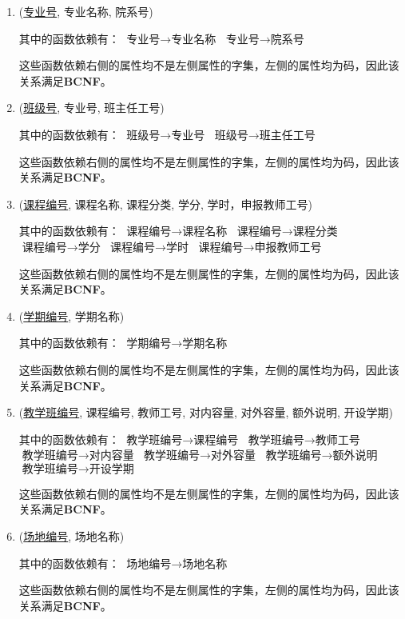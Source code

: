 \begin{enumerate}
    \item (\uline{专业号}, 专业名称, 院系号) \par
    其中的函数依赖有：
    $\text{专业号} \rightarrow \text{专业名称}$
    $\text{专业号} \rightarrow \text{院系号}$ \par
    这些函数依赖右侧的属性均不是左侧属性的字集，左侧的属性均为码，因此该关系满足\textbf{BCNF}。
    
    \item (\uline{班级号}, 专业号, 班主任工号) \par
    其中的函数依赖有：
    $\text{班级号} \rightarrow \text{专业号}$
    $\text{班级号} \rightarrow \text{班主任工号}$ \par
    这些函数依赖右侧的属性均不是左侧属性的字集，左侧的属性均为码，因此该关系满足\textbf{BCNF}。
    
    \item (\uline{课程编号}, 课程名称, 课程分类, 学分, 学时，申报教师工号) \par
    其中的函数依赖有：
    $\text{课程编号} \rightarrow \text{课程名称}$
    $\text{课程编号} \rightarrow \text{课程分类}$
    $\text{课程编号} \rightarrow \text{学分}$
    $\text{课程编号} \rightarrow \text{学时}$
    $\text{课程编号} \rightarrow \text{申报教师工号}$ \par
    这些函数依赖右侧的属性均不是左侧属性的字集，左侧的属性均为码，因此该关系满足\textbf{BCNF}。
    
    \item (\uline{学期编号}, 学期名称) \par
    其中的函数依赖有：
    $\text{学期编号} \rightarrow \text{学期名称}$ \par
    这些函数依赖右侧的属性均不是左侧属性的字集，左侧的属性均为码，因此该关系满足\textbf{BCNF}。
    
    \item (\uline{教学班编号}, 课程编号, 教师工号, 对内容量, 对外容量, 额外说明, 开设学期) \par
    其中的函数依赖有：
    $\text{教学班编号} \rightarrow \text{课程编号}$
    $\text{教学班编号} \rightarrow \text{教师工号}$
    $\text{教学班编号} \rightarrow \text{对内容量}$
    $\text{教学班编号} \rightarrow \text{对外容量}$
    $\text{教学班编号} \rightarrow \text{额外说明}$
    $\text{教学班编号} \rightarrow \text{开设学期}$ \par
    这些函数依赖右侧的属性均不是左侧属性的字集，左侧的属性均为码，因此该关系满足\textbf{BCNF}。
    
    \item (\uline{场地编号}, 场地名称) \par
    其中的函数依赖有：
    $\text{场地编号} \rightarrow \text{场地名称}$ \par
    这些函数依赖右侧的属性均不是左侧属性的字集，左侧的属性均为码，因此该关系满足\textbf{BCNF}。
    

\end{enumerate}

